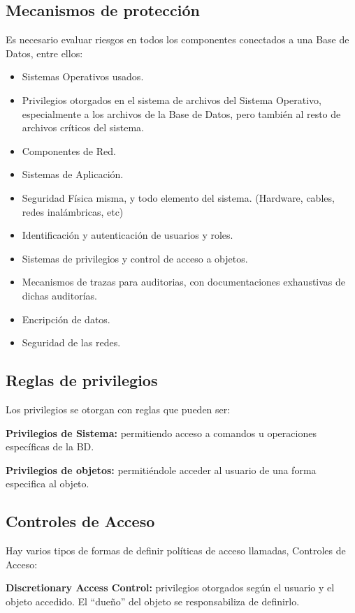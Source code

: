 \subsection*{Mecanismos de protección}

Es necesario evaluar riesgos en todos los componentes conectados a una Base de Datos, entre ellos:

\begin{itemize}
   \item Sistemas Operativos usados.
   \item Privilegios otorgados en el sistema de archivos del Sistema Operativo, especialmente a los archivos de la Base de Datos, pero también al resto de archivos críticos del sistema.
   \item Componentes de Red. 
   \item Sistemas de Aplicación.
   \item Seguridad Física misma, y todo elemento del sistema. (Hardware, cables, redes inalámbricas, etc)
   \item Identificación y autenticación de usuarios y roles.
   \item Sistemas de privilegios y control de acceso a objetos.
   \item Mecanismos de trazas para auditorias, con documentaciones exhaustivas de dichas auditorías.
   \item Encripción de datos.
   \item Seguridad de las redes.
\end{itemize}

\subsection*{Reglas de privilegios}

Los privilegios se otorgan con reglas que pueden ser:

\textbf{Privilegios de Sistema:} permitiendo acceso a comandos u operaciones específicas de la BD.

\textbf{Privilegios  de objetos:} permitiéndole acceder al usuario de una forma especifica al objeto.

\subsection*{Controles de Acceso}

Hay varios tipos de formas de definir políticas de acceso llamadas, Controles de Acceso:

\textbf{Discretionary Access Control:} privilegios otorgados según el usuario y el objeto accedido. El ``dueño'' del objeto se responsabiliza de definirlo.

